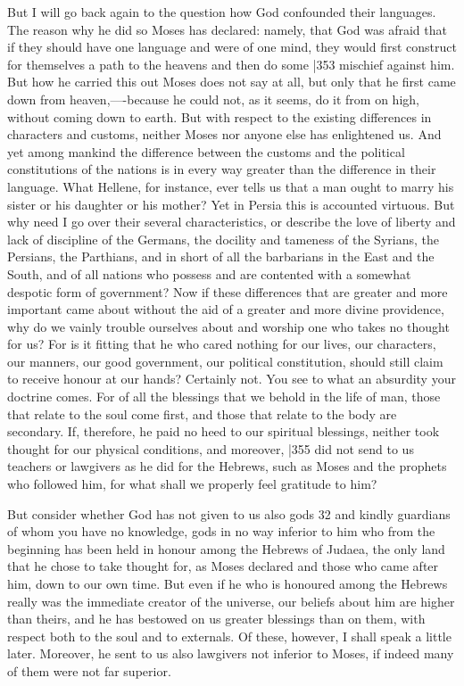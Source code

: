 But I will go back again to the question how God confounded their languages. The reason why he did so Moses has declared: namely, that God was afraid that if they should have one language and were of one mind, they would first construct for themselves a path to the heavens and then do some
|353 mischief against him. But how he carried this out Moses does not say at all, but only that he first came down from heaven,----because he could not, as it seems, do it from on high, without coming down to earth. But with respect to the existing differences in characters and customs, neither Moses nor anyone else has enlightened us. And yet among mankind the difference between the customs and the political constitutions of the nations is in every way greater than the difference in their language. What Hellene, for instance, ever tells us that a man ought to marry his sister or his daughter or his mother? Yet in Persia this is accounted virtuous. But why need I go over their several characteristics, or describe the love of liberty and lack of discipline of the Germans, the docility and tameness of the Syrians, the Persians, the Parthians, and in short of all the barbarians in the East and the South, and of all nations who possess and are contented with a somewhat despotic form of government? Now if these differences that are greater and more important came about without the aid of a greater and more divine providence, why do we vainly trouble ourselves about and worship one who takes no thought for us? For is it fitting that he who cared nothing for our lives, our characters, our manners, our good government, our political constitution, should still claim to receive honour at our hands? Certainly not. You see to what an absurdity your doctrine comes. For of all the blessings that we behold in the life of man, those that relate to the soul come first, and those that relate to the body are secondary. If, therefore, he paid no heed to our spiritual blessings, neither took thought for our physical conditions, and moreover,
|355 did not send to us teachers or lawgivers as he did for the Hebrews, such as Moses and the prophets who followed him, for what shall we properly feel gratitude to him?

But consider whether God has not given to us also gods 32
and kindly guardians of whom you have no knowledge, gods in no way inferior to him who from the beginning has been held in honour among the Hebrews of Judaea, the only land that he chose to take thought for, as Moses declared and those who came after him, down to our own time. But even if he who is honoured among the Hebrews really was the immediate creator of the universe, our beliefs about him are higher than theirs, and he has bestowed on us greater blessings than on them, with respect both to the soul and to externals. Of these, however, I shall speak a little later. Moreover, he sent to us also lawgivers not inferior to Moses, if indeed many of them were not far superior.

